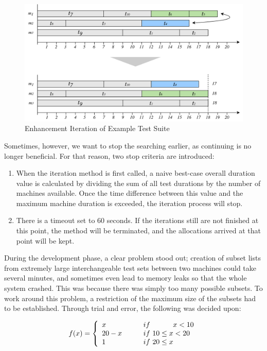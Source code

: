 \begin{figure}[t]
    \centering
    \includegraphics[width=\textwidth]{figures/new/iteration2.pdf}
    \caption{Enhancement Iteration of Example Test Suite}
    \label{fig.iteration}
\end{figure}

Sometimes, however, we want to stop the searching earlier, as continuing is no longer beneficial. For that reason, two stop criteria are introduced:

\begin{enumerate}
    \item When the iteration method is first called, a naive best-case overall duration value is calculated by dividing the sum of all test durations by the number of machines available. Once the time difference between this value and the maximum machine duration is exceeded, the iteration process will stop.
    \item There is a timeout set to 60 seconds. If the iterations still are not finished at this point, the method will be terminated, and the allocations arrived at that point will be kept.
\end{enumerate}

During the development phase, a clear problem stood out; creation of subset lists from extremely large interchangeable test sets between two machines could take several minutes, and sometimes even lead to memory leaks so that the whole system crashed. This was because there was simply too many possible subsets. To work around this problem, a restriction of the maximum size of the subsets had to be established. Through trial and error, the following was decided upon:

\[
\hfill
    f(x)=\left\{
        \begin{array}{l l}
          x         &   \hspace{20px} if \hspace{32px} x < 10\\
          20-x      &   \hspace{20px} if \ 10 \leq x < 20 \\
          1         &   \hspace{20px} if \ 20 \leq x
        \end{array}
    \right.
\hfill
\]

